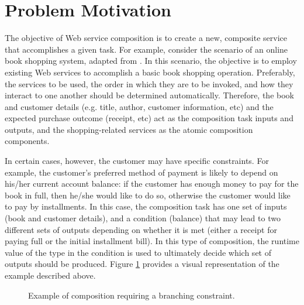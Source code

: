 \documentclass[conference]{IEEEtran}
\begin{document}
\section{Problem Motivation}\label{motivation}
The objective of Web service composition is to create a new, composite service that accomplishes a given task. For example, consider the scenario of an online book shopping system, adapted from \cite{wang2014automated}. In this scenario, the objective is to employ existing Web services to accomplish a basic book shopping operation. Preferably, the services to be used, the order in which they are to be invoked, and how they interact to one another should be determined automatically. Therefore, the 
book and customer details (e.g. title, author, customer information, etc) and the expected purchase outcome (receipt, etc) act as the 
composition task inputs and outputs, and the shopping-related services as the atomic composition components.

In certain cases, however, the customer may have specific constraints. For example, the customer's preferred method of payment is likely to depend on his/her current account
balance: if the customer has enough money to pay for the book in full, then he/she would like to do so, otherwise the customer would like to pay by installments.
In this case, the composition task has one set of inputs (book and customer details), and a condition (balance) that may lead to two different sets of outputs depending on whether it is met (either a receipt for paying full or the initial installment bill). In this type of composition, the runtime value of the type in the condition is used to ultimately decide which set of outputs should be produced. Figure \ref{fig:motivation} provides a visual representation of the example described above.

\begin{figure}
\centerline{
}
\caption{Example of composition requiring a branching constraint.}
\label{fig:motivation}
\end{figure}
\end{document}
